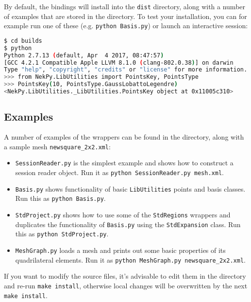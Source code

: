 By default, the bindings will install into the \texttt{dist} directory, along
with a number of examples that are stored in the
 directory. To test your installation, you
can for example run one of these (e.g. \texttt{python Basis.py}) or launch an
interactive session:

\begin{lstlisting}[language=bash]
$ cd builds
$ python
Python 2.7.13 (default, Apr  4 2017, 08:47:57) 
[GCC 4.2.1 Compatible Apple LLVM 8.1.0 (clang-802.0.38)] on darwin
Type "help", "copyright", "credits" or "license" for more information.
>>> from NekPy.LibUtilities import PointsKey, PointsType
>>> PointsKey(10, PointsType.GaussLobattoLegendre)
<NekPy.LibUtilities._LibUtilities.PointsKey object at 0x11005c310>
\end{lstlisting}

\subsection{Examples}

A number of examples of the wrappers can be found in the 
directory, along with a sample mesh \texttt{newsquare\_2x2.xml}:

\begin{itemize}
	\item \texttt{SessionReader.py} is the simplest example and shows how to construct a
  		session reader object. Run it as \texttt{python SessionReader.py mesh.xml}.
  	\item \texttt{Basis.py} shows functionality of basic \texttt{LibUtilities} points and basis
  		classes. Run this as \texttt{python Basis.py}.
	\item \texttt{StdProject.py} shows how to use some of the \texttt{StdRegions} wrappers and
  		duplicates the functionality of \texttt{Basis.py} using the \texttt{StdExpansion} class. Run
  		this as \texttt{python StdProject.py}.
	\item \texttt{MeshGraph.py} loads a mesh and prints out some basic properties of its
		quadrilateral elements. Run it as \texttt{python MeshGraph.py newsquare\_2x2.xml}.
\end{itemize}

If you want to modify the source files, it's advisable to edit them in the
 directory and 
re-run \texttt{make install}, otherwise local changes will be overwritten by the next \texttt{make install}.
